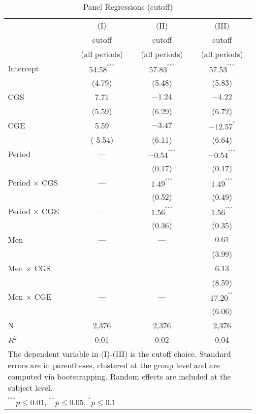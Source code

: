 \documentclass[12pt, letterpaper]{article}
\theoremstyle{plain}
\begin{document}
\begin{table}[ht]
\centering
\caption{Panel Regressions (cutoff)}
\footnotesize
\begin{tabular}{lccc}

  & (I) & (II) & (III) \\
&  cutoff & cutoff & cutoff   \\
&  (all periods) & (all periods)  & (all periods)   \\
    \hline
Intercept & $54.58^{^{***}}$ & $57.83^{^{***}}$ &  $ 57.53^{^{***}}$ \\
& (4.79) & (5.48) & (5.83) \\
CGS &  7.71 & $-1.24$ &  $-4.22$  \\
& (5.59) & (6.29) & (6.72) \\
CGE &  5.59 & $-3.47$ &  $-12.57^{^{*}}$ \\
& ( 5.54) &  (6.11) & (6.64) \\
Period & ---& $-0.54^{^{***}}$ & $-0.54^{^{***}}$ \\
& & (0.17)&  (0.17) \\
Period $\times$ CGS & ---& $1.49^{^{***}}$& $ 1.49^{^{***}}$ \\
& & (0.52) & (0.49)  \\
Period $\times$ CGE & ---& $1.56^{^{***}}$& $1.56^{^{***}}$\\
& & (0.36) & (0.35) \\
Men & --- &  --- & $0.61$  \\
& &  & (3.99) \\
Men $\times$ CGS & ---& --- &  6.13 \\
& & & (8.59) \\
Men $\times$ CGE & ---& --- & $17.20^{^{**}}$ \\
& & & (6.06)\\

\hline
N & 2,376 & 2,376 & 2,376 \\ 
$R^2$ & 0.01 & 0.02 & 0.04 \\
\hline
\hline
 \multicolumn{4}{p{.6\textwidth}}{\scriptsize{The dependent variable in (I)-(III)  is the cutoff choice. Standard errors are in parentheses, clustered at the group level and are computed via bootstrapping. Random effects are included at the subject level.}}\\ 
 \multicolumn{4}{p{0.4\textwidth}}{\scriptsize{ $^{^{***}}p\leq0.01$,
    $^{^{**}}p\leq0.05$, $^{^{*}}p\leq0.1$}} \\
\end{tabular}
\label{table:ols_cutoff}
\end{table}
\end{document}
